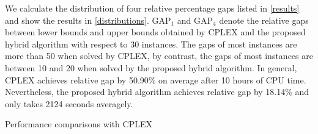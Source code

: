 \documentclass[11pt,nonblindrev,fleqn]{article}
\begin{document}
We calculate the distribution of four relative percentage gaps listed in \autoref{results} and show the results in \autoref{distributions}. GAP$_1$ and GAP$_4$ denote the relative gaps between lower bounds and upper bounds obtained by CPLEX and the proposed hybrid algorithm with respect to 30 instances. The gaps of most instances are more than 50 when solved by CPLEX, by contrast, the gaps of most instances are between 10 and 20 when solved by the proposed hybrid algorithm. In general, CPLEX achieves relative gap by 50.90\% on average after 10 hours of CPU time. Nevertheless, the proposed hybrid algorithm achieves relative gap by 18.14\% and only takes 2124 seconds averagely. 

\begin{table}[H]
\setlength{\abovecaptionskip}{-3pt}
\setlength{\belowcaptionskip}{5pt}
\centering
  \footnotesize
  \caption{Performance comparisons with CPLEX}
  \label{results}


\end{table}
\end{document}
